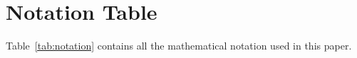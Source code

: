\documentclass{article}
\theoremstyle{definition}
\theoremstyle{remark}
\begin{document}





\newpage

\appendix
\section{Notation Table}
\label{app:notation}
Table~\ref{tab:notation} contains all the mathematical notation used in this paper.
%
\end{document}
